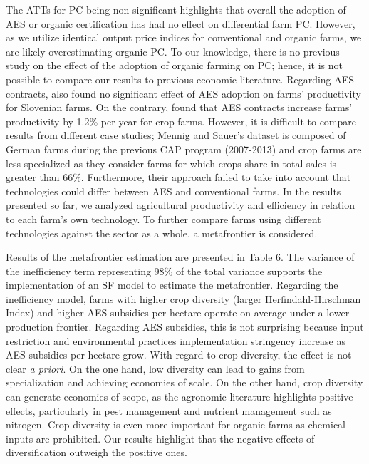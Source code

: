 \begin{Article}
\begin{refsection}[Lassalas]
The ATTs for PC being non-significant highlights that overall the
adoption of AES or organic certification has had no effect on
differential farm PC. However, as we utilize identical output price
indices for conventional and organic farms, we are likely overestimating
organic PC. To our knowledge, there is no previous study on the effect
of the adoption of organic farming on PC; hence, it is not possible to
compare our results to previous economic literature. Regarding AES
contracts, \textcite{barath2020effect} also found no significant
effect of AES adoption on farms' productivity for Slovenian farms. On
the contrary, \textcite{mennig_sauer_2020} found that AES contracts
increase farms' productivity by 1.2\% per year for crop farms. However,
it is difficult to compare results from different case studies; Mennig and Sauer's dataset is composed of German farms during the
previous CAP program (2007-2013) and crop farms are less specialized as
they consider farms for which crops share in total sales is greater than
66\%. Furthermore, their approach failed to take into account that
technologies could differ between AES and conventional farms. In the
results presented so far, we analyzed agricultural productivity and
efficiency in relation to each farm's own technology. To further compare
farms using different technologies against the sector as a whole, a
metafrontier is considered.

Results of the metafrontier estimation are presented in Table 6. The
variance of the inefficiency term representing 98\% of the total
variance supports the implementation of an SF model to estimate the
metafrontier. Regarding the inefficiency model, farms with higher crop
diversity (larger Herfindahl-Hirschman Index) and higher AES subsidies
per hectare operate on average under a lower production frontier.
Regarding AES subsidies, this is not surprising because input
restriction and environmental practices implementation stringency
increase as AES subsidies per hectare grow. With regard to crop
diversity, the effect is not clear \textit{a priori}. On the one hand, low
diversity can lead to gains from specialization and achieving economies
of scale. On the other hand, crop diversity can generate economies of
scope, as the agronomic literature highlights positive effects,
particularly in pest management and nutrient management such as
nitrogen. Crop diversity is even more important for organic farms as
chemical inputs are prohibited. Our results highlight that the negative
effects of diversification outweigh the positive ones.


\end{refsection}
\end{Article}
